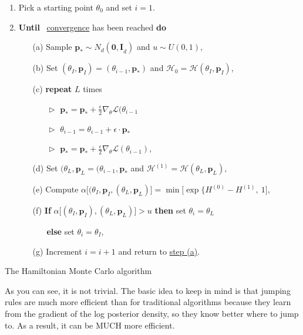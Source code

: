 \documentclass[11pt,a4paper,openany ]{book}
\begin{document}
\begin{algorithm}[H]\label{algo_hmc}
	\SetAlgoLined
	\begin{enumerate}
		\item Pick a starting point $\theta_0$ and set $i=1$.
		\item \textbf{Until} \ \underline{convergence} has been reached \quad \textbf{do}
		\begin{itemize}
			\item[(a)]\label{item1hmc} Sample $\boldsymbol{p}_*\sim N_d(\boldsymbol{0,I}_d)$ and $ u\sim U(0,1)$,
			\item[(b)] Set $(\theta_I,\boldsymbol{p}_I)=(\theta_{i-1},\boldsymbol{p_*})$ and $\mathcal{H}_0=\mathcal{H}(\theta_I,\boldsymbol{p}_I)$,
			\item[(c)] \textbf{repeat} $L$ times 
			\begin{itemize}
				\item[$\vartriangleright$] $ \boldsymbol{p}_*=\boldsymbol{p}_*+\frac{\epsilon}{2}\nabla_{\theta}\mathcal{L}(\theta_{i-1} $
				\item[$\vartriangleright$] $\theta_{i-1}=\theta_{i-1}+\epsilon\cdot\boldsymbol{p}_*$
				\item[$\vartriangleright$] $ \boldsymbol{p}_*=\boldsymbol{p}_*+\frac{\epsilon}{2}\nabla_{\theta}\mathcal{L}(\theta_{i-1})$,
			\end{itemize}
			\item[(d)] Set $(\theta_L,\boldsymbol{p}_L=(\theta_{i-1},\boldsymbol{p}_*$ and $\mathcal{H}^{(1)}=\mathcal{H}(\theta_L,\boldsymbol{p}_L),$
			\item[(e)] Compute $\alpha\Big[(\theta_I,\boldsymbol{p}_I,(\theta_L,\boldsymbol{p}_L)\Big]=\min\Big[\exp\{H^{(0)}-H^{(1)},\ 1\Big]$,
			\item[(f)] \textbf{If}  $\alpha\Big[(\theta_I,\boldsymbol{p}_I),(\theta_L,\boldsymbol{p}_L)\Big]>u$  \textbf{then}  	set $\theta_i=\theta_L$ 
			\begin{itemize}
				\item[] \textbf{else}   set $\theta_i=\theta_I$,
			\end{itemize}
            \item[(g)]  Increment $i=i+1$ and return to \hyperref[item1hmc]{step (a)}.
		\end{itemize}
	\end{enumerate}
	\caption{The Hamiltonian Monte Carlo algorithm}
\end{algorithm}


As you can see, it is not trivial.
The basic idea to keep in mind is that jumping rules are much more efficient than for traditional algorithms because they
 learn from the gradient of the log posterior density, so they know better
where to jump to. As a result, it can be MUCH more efficient.
\end{document}
